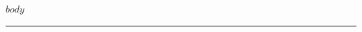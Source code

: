 \documentclass[
  letterpaper,
  DIV=11,
  numbers=noendperiod]{scrartcl}
\begin{document}
$body$
\hrule
\vspace{6pt}
\end{document}
